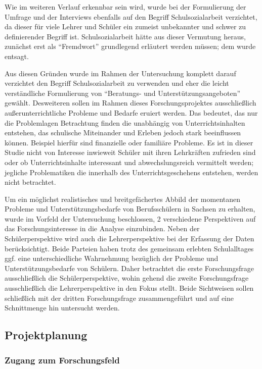 Wie im weiteren Verlauf erkennbar sein wird, wurde bei der Formulierung der Umfrage und der Interviews ebenfalls auf den Begriff Schulsozialarbeit verzichtet, da dieser für viele Lehrer und Schüler ein zumeist unbekannter und schwer zu definierender Begriff ist. Schulsozialarbeit hätte aus dieser Vermutung heraus, zunächst erst als "`Fremdwort"' grundlegend erläutert werden müssen; dem wurde entsagt.

Aus diesen Gründen wurde im Rahmen der Untersuchung komplett darauf verzichtet den Begriff Schulsozialarbeit zu verwenden und eher die leicht verständliche Formulierung von "`Beratungs- und Unterstützungsangeboten"' gewählt. 
Desweiteren sollen im Rahmen dieses Forschungsprojektes ausschließlich außerunterrichtliche Probleme und Bedarfe eruiert werden. Das bedeutet, das nur die Problemlagen Betrachtung finden die unabhängig von Unterrichtsinhalten entstehen, das schulische Miteinander und Erleben jedoch stark beeinflussen können. Beispiel hierfür sind finanzielle oder familiäre Probleme. Es ist in dieser Studie nicht von Interesse inwieweit Schüler mit ihren Lehrkräften zufrieden sind oder ob Unterrichtsinhalte interessant und abwechslungsreich vermittelt werden; jegliche Problematiken die innerhalb des Unterrichtsgeschehens entstehen, werden nicht betrachtet. 

Um ein möglichst realistisches und breitgefächertes Abbild der momentanen Probleme und Unterstützungsbedarfe von Berufsschülern in Sachsen zu erhalten, wurde im Vorfeld der Untersuchung beschlossen, 2 verschiedene Perspektiven auf das Forschungsinteresse in die Analyse einzubinden. Neben der Schülerperspektive wird auch die Lehrerperspektive bei der Erfassung der Daten berücksichtigt. Beide Parteien haben trotz des gemeinsam erlebten Schulalltages ggf. eine unterschiedliche Wahrnehmung bezüglich der Probleme und Unterstützungsbedarfe von Schülern. Daher betrachtet die erste Forschungsfrage ausschließlich die Schülerperspektive, wohin gehend die zweite Forschungsfrage ausschließlich die Lehrerperspektive in den Fokus stellt. Beide Sichtweisen sollen schließlich mit der dritten Forschungsfrage zusammengeführt und auf eine Schnittmenge hin untersucht werden.

\subsection{Projektplanung}
\label{sec:Projektplanung}

\subsubsection{Zugang zum Forschungsfeld}
\label{sec:ZugangZumForschungsfeld}

